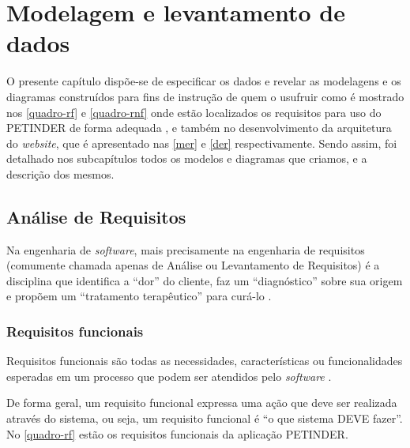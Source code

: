 \chapter{Modelagem e levantamento de dados}
O presente capítulo dispõe-se de especificar os dados e revelar as modelagens e os diagramas construídos para fins de instrução de quem o usufruir como é mostrado nos \autoref{quadro-rf} e \autoref{quadro-rnf} onde estão localizados os requisitos para uso do PETINDER de forma adequada , e também no desenvolvimento da arquitetura do \textit{website}, que é apresentado nas \autoref{mer} e \autoref{der} respectivamente. Sendo assim, foi detalhado nos subcapítulos todos os modelos e diagramas que criamos, e a descrição dos mesmos.


\section{Análise de Requisitos}
Na engenharia de \textit{software}, mais precisamente na engenharia de requisitos (comumente chamada apenas de Análise ou Levantamento de Requisitos) é a disciplina que identifica a “dor” do cliente, faz um “diagnóstico” sobre sua origem e propõem um “tratamento terapêutico” para curá-lo \cite{analise}.

\subsection{Requisitos funcionais}
Requisitos funcionais são todas as necessidades, características ou funcionalidades esperadas em um processo que podem ser atendidos pelo \textit{software} \cite{analise}.

De forma geral, um requisito funcional expressa uma ação que deve ser realizada através do sistema, ou seja, um requisito funcional é “o que sistema DEVE fazer”.  No \autoref{quadro-rf} estão os requisitos funcionais da aplicação PETINDER.

